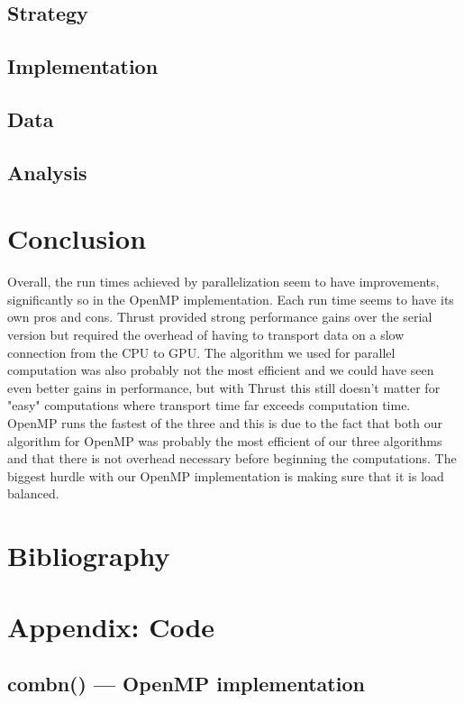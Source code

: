 \documentclass[titlepage, 11pt]{article}
\begin{document}
\subsection{Strategy}

\subsection{Implementation}


\subsection{Data}

\subsection{Analysis}




\section{Conclusion}
Overall, the run times achieved by parallelization seem to have improvements, significantly so in the OpenMP implementation. Each run time seems to have its own pros and cons. Thrust provided strong performance gains over the serial version but required the overhead of having to transport data on a slow connection from the CPU to GPU. The algorithm we used for parallel computation was also probably not the most efficient and we could have seen even better gains in performance, but with Thrust this still doesn't matter for "easy" computations where transport time far exceeds computation time. OpenMP runs the fastest of the three and this is due to the fact that both our algorithm for OpenMP was probably the most efficient of our three algorithms and that there is not overhead necessary before beginning the computations. The biggest hurdle with our OpenMP implementation is making sure that it is load balanced.


\section{Bibliography}


\pagebreak
\appendix
\section{Appendix: Code}
\subsection{combn() --- OpenMP implementation}

\end{document}
